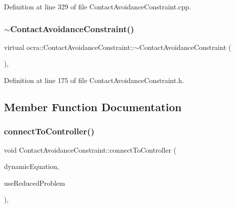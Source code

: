Definition at line 329 of file Contact\+Avoidance\+Constraint.\+cpp.

\hypertarget{classocra_1_1ContactAvoidanceConstraint_a57650df61143b936321c20d582f2457f}{}\label{classocra_1_1ContactAvoidanceConstraint_a57650df61143b936321c20d582f2457f} 
\subsubsection{\texorpdfstring{$\sim$\+Contact\+Avoidance\+Constraint()}{~ContactAvoidanceConstraint()}}
{\footnotesize\ttfamily virtual ocra\+::\+Contact\+Avoidance\+Constraint\+::$\sim$\+Contact\+Avoidance\+Constraint (\begin{DoxyParamCaption}{ }\end{DoxyParamCaption})\hspace{0.3cm}{\ttfamily [inline]}, {\ttfamily [virtual]}}



Definition at line 175 of file Contact\+Avoidance\+Constraint.\+h.



\subsection{Member Function Documentation}
\hypertarget{classocra_1_1ContactAvoidanceConstraint_a9beada2720203ab46265f271309a2ab5}{}\label{classocra_1_1ContactAvoidanceConstraint_a9beada2720203ab46265f271309a2ab5} 
\subsubsection{\texorpdfstring{connect\+To\+Controller()}{connectToController()}}
{\footnotesize\ttfamily void Contact\+Avoidance\+Constraint\+::connect\+To\+Controller (\begin{DoxyParamCaption}\item[{const \hyperlink{classocra_1_1FullDynamicEquationFunction}{Full\+Dynamic\+Equation\+Function} \&}]{dynamic\+Equation,  }\item[{bool}]{use\+Reduced\+Problem }\end{DoxyParamCaption})\hspace{0.3cm}{\ttfamily [protected]}, {\ttfamily [virtual]}}



